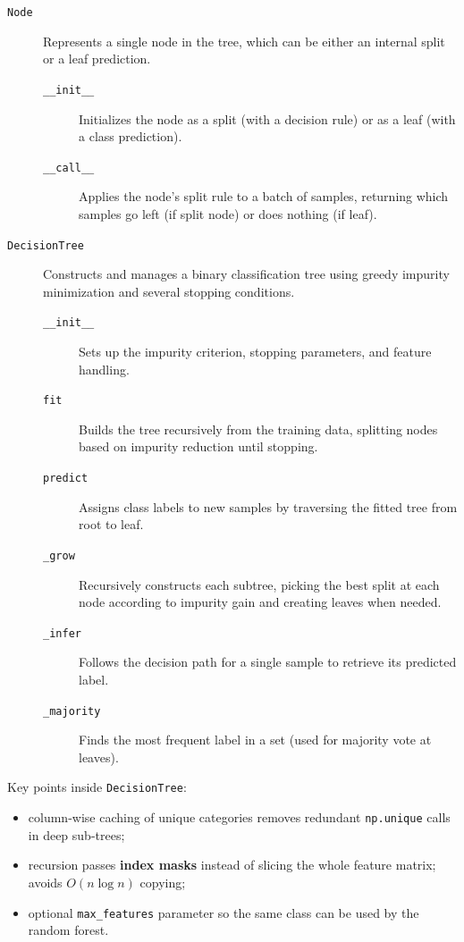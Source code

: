 \documentclass[12pt]{report}
\begin{document}
\begin{description}
  \item[\texttt{Node}]
        Represents a single node in the tree, which can be either an internal split or
        a leaf prediction.
    \begin{description}
      \item[\texttt{\_\_init\_\_}]
            Initializes the node as a split (with a decision rule) or as a leaf (with a
            class prediction).
      \item[\texttt{\_\_call\_\_}]
            Applies the node's split rule to a batch of samples, returning which
            samples go left (if split node) or does nothing (if leaf).
    \end{description}

  \item[\texttt{DecisionTree}]
        Constructs and manages a binary classification tree using greedy impurity
        minimization and several stopping conditions.
    \begin{description}
      \item[\texttt{\_\_init\_\_}]
            Sets up the impurity criterion, stopping parameters, and feature handling.
      \item[\texttt{fit}]
            Builds the tree recursively from the training data, splitting nodes based
            on impurity reduction until stopping.
      \item[\texttt{predict}]
            Assigns class labels to new samples by traversing the fitted tree from root
            to leaf.
      \item[\texttt{\_grow}]
            Recursively constructs each subtree, picking the best split at each node
            according to impurity gain and creating leaves when needed.
      \item[\texttt{\_infer}]
            Follows the decision path for a single sample to retrieve its predicted
            label.
      \item[\texttt{\_majority}]
            Finds the most frequent label in a set (used for majority vote at leaves).
    \end{description}
\end{description}

Key points inside \texttt{DecisionTree}:

\begin{itemize}
  \item column-wise caching of unique categories removes redundant
        \texttt{np.unique} calls in deep sub-trees;
  \item recursion passes \textbf{index masks} instead of slicing the whole
        feature matrix; avoids $O(n\log n)$ copying;
  \item optional \texttt{max\_features} parameter so the same class can be used
        by the random forest.
\end{itemize}
\end{document}
